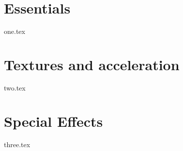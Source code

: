 

\addto\captionsenglish{\renewcommand{\chaptername}{Milestone}}



 
\tableofcontents
\setcounter{page}{0}

\chapter{Essentials}
{one.tex}

\chapter{Textures and acceleration}
{two.tex}

\chapter{Special Effects}
{three.tex}
